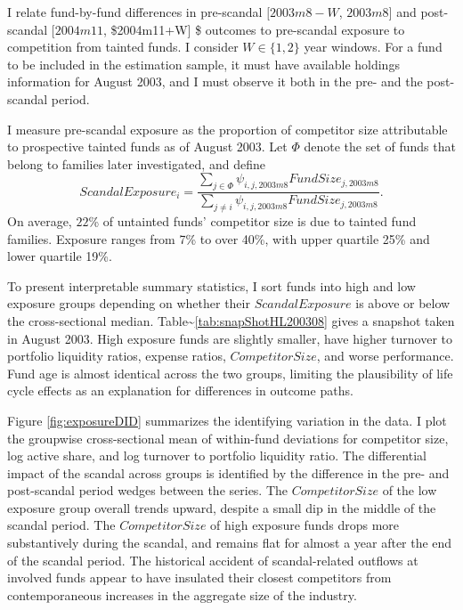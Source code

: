 \documentclass[]{book}
\theoremstyle{definition}
\theoremstyle{definition}
\theoremstyle{definition}
\theoremstyle{remark}
\begin{document}
I relate fund-by-fund differences in pre-scandal \([2003m8-W\),
\(2003m8]\) and post-scandal \([2004m11\), \$2004m11+W{]} \$ outcomes to
pre-scandal exposure to competition from tainted funds. I consider
\(W\in\{1,2\}\) year windows. For a fund to be included in the
estimation sample, it must have available holdings information for
August 2003, and I must observe it both in the pre- and the post-scandal
period.

I measure pre-scandal exposure as the proportion of competitor size
attributable to prospective tainted funds as of August 2003. Let
\(\Phi\) denote the set of funds that belong to families later
investigated, and define \begin{equation}
ScandalExposure_i = \frac{\sum_{j\in \Phi} \psi_{i,j,2003m8} FundSize_{j,2003m8}}{\sum_{j\neq i}\psi_{i,j,2003m8} FundSize_{j,2003m8}}.
\end{equation} On average, \(22\)\% of untainted funds' competitor size
is due to tainted fund families. Exposure ranges from 7\% to over 40\%,
with upper quartile 25\% and lower quartile 19\%.

To present interpretable summary statistics, I sort funds into high and
low exposure groups depending on whether their \(ScandalExposure\) is
above or below the cross-sectional median.
Table\textasciitilde{}\ref{tab:snapShotHL200308} gives a snapshot taken
in August 2003. High exposure funds are slightly smaller, have higher
turnover to portfolio liquidity ratios, expense ratios,
\(CompetitorSize\), and worse performance. Fund age is almost identical
across the two groups, limiting the plausibility of life cycle effects
as an explanation for differences in outcome paths.

Figure \ref{fig:exposureDID} summarizes the identifying variation in the
data. I plot the groupwise cross-sectional mean of within-fund
deviations for competitor size, log active share, and log turnover to
portfolio liquidity ratio. The differential impact of the scandal across
groups is identified by the difference in the pre- and post-scandal
period wedges between the series. The \(CompetitorSize\) of the low
exposure group overall trends upward, despite a small dip in the middle
of the scandal period. The \(CompetitorSize\) of high exposure funds
drops more substantively during the scandal, and remains flat for almost
a year after the end of the scandal period. The historical accident of
scandal-related outflows at involved funds appear to have insulated
their closest competitors from contemporaneous increases in the
aggregate size of the industry.
\end{document}
